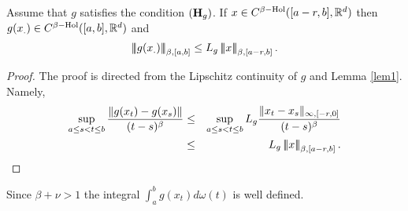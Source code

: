 \documentclass[graybox]{svmult}
\newcommand{\R}{\ensuremath{\mathbb{R}}}
\newcommand{\ltn}{\ensuremath{\left| \! \left| \! \left|}}
\newcommand{\rtn}{\ensuremath{\right| \! \right| \! \right|}}
\begin{document}
\begin{lemma}\label{lem2}
	Assume that $g$ satisfies the condition $({\textbf H}_g)$. If $x\in C^{\beta\rm{-Hol}}([a-r,b],\R^d)$  then $g(x_.)\in C^{\beta\rm{-Hol}}([a,b],\R^d)$ and 
	\begin{eqnarray}
	\ltn g(x_{.} )\rtn_{\beta,[a,b]} \leq L_g\ltn x \rtn_{\beta,[a-r,b]}.
	\end{eqnarray}
\end{lemma}
\begin{proof}
	The proof is directed from the Lipschitz continuity of $g$ and Lemma \ref{lem1}. Namely, %
	\begin{eqnarray*}
		\sup_{a\leq s<t\leq b}\frac{\|g(x_t)-g(x_s)\|}{(t-s)^{\beta}} &\leq& \sup_{a\leq s<t\leq b} L_g\frac{\|x_t-x_s\|_{\infty,[-r,0]}}{(t-s)^{\beta}}\\
		&\leq & L_g \ltn x \rtn_{\beta,[a-r,b]}.
	\end{eqnarray*}
\end{proof}


\begin{remark}
	Since $\beta+\nu>1$ the integral $\int_a^bg(x_t)d\omega(t)$ is well defined.
\end{remark}

\end{document}
